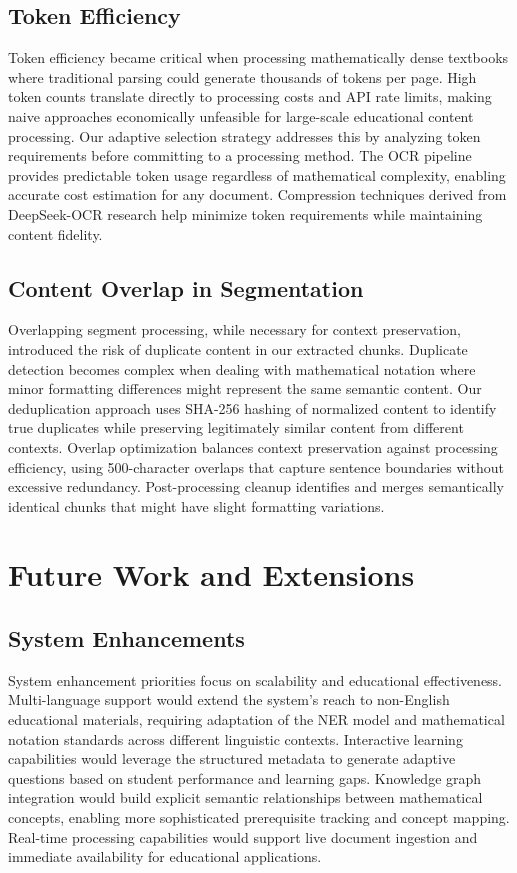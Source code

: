 \documentclass[12pt]{article}
\begin{document}
\subsection{Token Efficiency}

Token efficiency became critical when processing mathematically dense textbooks where traditional parsing could generate thousands of tokens per page. High token counts translate directly to processing costs and API rate limits, making naive approaches economically unfeasible for large-scale educational content processing. Our adaptive selection strategy addresses this by analyzing token requirements before committing to a processing method. The OCR pipeline provides predictable token usage regardless of mathematical complexity, enabling accurate cost estimation for any document. Compression techniques derived from DeepSeek-OCR research help minimize token requirements while maintaining content fidelity.

\subsection{Content Overlap in Segmentation}

Overlapping segment processing, while necessary for context preservation, introduced the risk of duplicate content in our extracted chunks. Duplicate detection becomes complex when dealing with mathematical notation where minor formatting differences might represent the same semantic content. Our deduplication approach uses SHA-256 hashing of normalized content to identify true duplicates while preserving legitimately similar content from different contexts. Overlap optimization balances context preservation against processing efficiency, using 500-character overlaps that capture sentence boundaries without excessive redundancy. Post-processing cleanup identifies and merges semantically identical chunks that might have slight formatting variations.

\section{Future Work and Extensions}

\subsection{System Enhancements}

System enhancement priorities focus on scalability and educational effectiveness. Multi-language support would extend the system's reach to non-English educational materials, requiring adaptation of the NER model and mathematical notation standards across different linguistic contexts. Interactive learning capabilities would leverage the structured metadata to generate adaptive questions based on student performance and learning gaps. Knowledge graph integration would build explicit semantic relationships between mathematical concepts, enabling more sophisticated prerequisite tracking and concept mapping. Real-time processing capabilities would support live document ingestion and immediate availability for educational applications.
\end{document}
